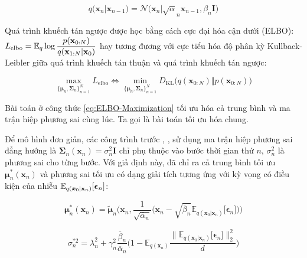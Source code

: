 \documentclass[14pt, a4paper]{article}
\numberwithin{equation}{section}
\numberwithin{figure}{section}
\numberwithin{dl}{section}
\numberwithin{md}{section}
\numberwithin{bd}{section}
\numberwithin{dn}{section}
\numberwithin{hq}{section}
\begin{document}
    \begin{equation}
        q\big( \boldsymbol{x}_n \vert \boldsymbol{x}_{n-1} \big)=\mathcal{N} \big( \boldsymbol{x}_n \vert \sqrt{\alpha}_n \boldsymbol{x}_{n-1}, \beta_n \boldsymbol{I} \big)
    \end{equation}

    Quá trình khuếch tán ngược được học bằng cách cực đại hóa cận dưới (ELBO): $L_{\mathrm{elbo}}=\mathbb{E}_q \log \dfrac{p(\bold{x}_{0:N})}{q(\bold{x}_{1:N}\vert \bold{x}_0)}$ hay tương đương với cực tiểu hóa độ phân kỳ Kullback-Leibler giữa quá trình khuếch tán thuận và quá trình khuếch tán ngược:

    \begin{equation} \label{eq:ELBO-Maximization}
        \max_{\lbrace \boldsymbol{\mu}_n, \boldsymbol{\Sigma}_n \rbrace_{n=1}^N} L_{\mathrm{elbo}} \Leftrightarrow \min_{\lbrace \boldsymbol{\mu}_n, \boldsymbol{\Sigma}_n \rbrace_{n=1}^N} D_{\mathrm{KL}} \big( q(\boldsymbol{x}_{0:N}) \Vert p(\boldsymbol{x}_{0:N}) \big)
    \end{equation}

    Bài toán ở công thức \ref{eq:ELBO-Maximization} tối ưu hóa cả trung bình và ma trận hiệp phương sai cùng lúc. 
    Ta gọi là bài toán tối ưu hóa chung.

    Để mô hình đơn giản, các công trình trước \cite{ho2020denoising}, \cite{song2020denoising}, \cite{bao2021analytic} sử dụng ma trận hiệp phương sai đẳng hướng là $\boldsymbol{\Sigma}_n(\boldsymbol{x}_n)=\sigma_n^2 \boldsymbol{I}$ chỉ phụ thuộc vào bước thời gian thứ $n$, $\sigma_n^2$ là phương sai cho từng bước.
    Với giả định này, \cite{bao2021analytic} đã chỉ ra cả trung bình tối ưu $\boldsymbol{\mu}_n^{\ast} (\boldsymbol{x}_n)$ và phương sai tối ưu có dạng giải tích tương ứng với kỳ vọng có điều kiện của nhiễu $\mathbb{E}_{q( \boldsymbol{x}_0 \vert \bold{x}_n )} \lbrack \boldsymbol{\epsilon}_n \rbrack$:

    \begin{equation} \label{eq:Optimal-Mean}
        \boldsymbol{\mu}_n^{\ast} (\boldsymbol{x}_n)=\tilde{\boldsymbol{\mu}}_n \Bigg( \boldsymbol{x}_n, \dfrac{1}{\sqrt{\overline{\alpha}_n}} \Big( \boldsymbol{x}_n - \sqrt{\overline{\beta}_n} \mathbb{E}_{q(\boldsymbol{x}_0 \vert \boldsymbol{x}_n)} \lbrack \boldsymbol{\epsilon}_n \rbrack \Big) \Bigg)
    \end{equation}

    \begin{equation} \label{eq:Optimal-Isotropic-Variance}
        \sigma_n^{\ast 2}=\lambda_n^2 + \gamma_n^2 \dfrac{\overline{\beta}_n}{\overline{\alpha}_n} \Bigg( 1 - \mathbb{E}_{q(\boldsymbol{x}_n)} \dfrac{\lVert \mathbb{E}_{q(\boldsymbol{x}_0 \vert \boldsymbol{x}_n)} \lbrack \boldsymbol{\epsilon}_n \rbrack\rVert_2^2}{d} \Bigg)
    \end{equation}
\end{document}
